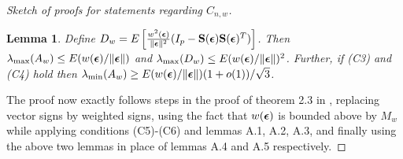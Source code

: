 \documentclass[12pt,letterpaper]{article}
\newtheorem{Lemma}[Theorem]{Lemma}
\theoremstyle{definition} \newtheorem{Definition}[Theorem]{Definition}
\begin{document}
\begin{proof}[Sketch of proofs for statements regarding $C_{n,w}$]
\begin{Lemma}
Define $D_w = E \left[ \frac{w^2({\boldsymbol{\epsilon}})}{\| {\boldsymbol{\epsilon}} \|^2} (I_p - {\mathbf{S}}({\boldsymbol{\epsilon}}) {\mathbf{S}}({\boldsymbol{\epsilon}})^T )\right] $. Then $\lambda_{\max} (A_w) \leq E( w({\boldsymbol{\epsilon}})/\| {\boldsymbol{\epsilon}} \|)$ and $\lambda_{\max} (D_w) \leq E( w({\boldsymbol{\epsilon}})/\| {\boldsymbol{\epsilon}} \|)^2$. Further, if (C3) and (C4) hold then $\lambda_{\min} (A_w) \geq E( w({\boldsymbol{\epsilon}})/\| {\boldsymbol{\epsilon}} \|)(1+o(1))/\sqrt 3$.
\end{Lemma}
%
The proof now exactly follows steps in the proof of theorem 2.3 in \cite{WangPengLi15}, replacing vector signs by weighted signs, using the fact that $w({\boldsymbol{\epsilon}})$ is bounded above by $M_w$ while applying conditions (C5)-(C6) and lemmas A.1, A.2, A.3, and finally using the above two lemmas in place of lemmas A.4 and A.5 respectively.

\end{proof}



\end{document}

